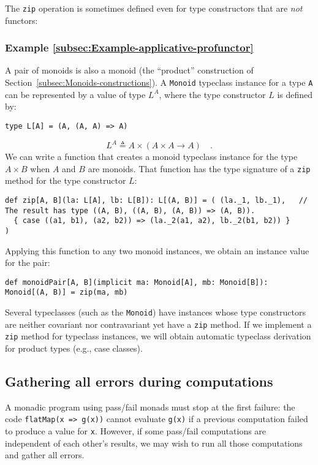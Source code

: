 The \lstinline!zip! operation is sometimes defined even for type
constructors that are \emph{not} functors:

\subsubsection{Example \label{subsec:Example-applicative-profunctor}\ref{subsec:Example-applicative-profunctor}}

A pair of monoids is also a monoid (the \textsf{``}product\textsf{''} construction
of Section~\ref{subsec:Monoids-constructions}). A \lstinline!Monoid!
typeclass instance for a type \lstinline!A! can be represented by
a value of type $L^{A}$, where the type constructor $L$ is defined
by:
\begin{lstlisting}
type L[A] = (A, (A, A) => A)
\end{lstlisting}
\[
L^{A}\triangleq A\times\left(A\times A\rightarrow A\right)\quad.
\]
We can write a function that creates a monoid typeclass instance for
the type $A\times B$ when $A$ and $B$ are monoids. That function
has the type signature of a \lstinline!zip! method for the type constructor
$L$:
\begin{lstlisting}
def zip[A, B](la: L[A], lb: L[B]): L[(A, B)] = ( (la._1, lb._1),   // The result has type ((A, B), ((A, B), (A, B)) => (A, B)).
  { case ((a1, b1), (a2, b2)) => (la._2(a1, a2), lb._2(b1, b2)) }
)
\end{lstlisting}
Applying this function to any two monoid instances, we obtain an instance
value for the pair:
\begin{lstlisting}
def monoidPair[A, B](implicit ma: Monoid[A], mb: Monoid[B]): Monoid[(A, B)] = zip(ma, mb)
\end{lstlisting}

Several typeclasses (such as the \lstinline!Monoid!) have instances
whose type constructors are neither covariant nor contravariant yet
have a \lstinline!zip! method. If we implement a \lstinline!zip!
method for typeclass instances, we will obtain automatic typeclass
derivation for product types (e.g., case classes).

\subsection{Gathering all errors during computations\label{subsec:Programs-that-accumulate-errors}}

A monadic program using pass/fail monads must stop at the first failure:
the code \lstinline!flatMap(x => g(x))! cannot evaluate \lstinline!g(x)!
if a previous computation failed to produce a value for \lstinline!x!.
However, if some pass/fail computations are independent of each other\textsf{'}s
results, we may wish to run all those computations and gather all
errors.

